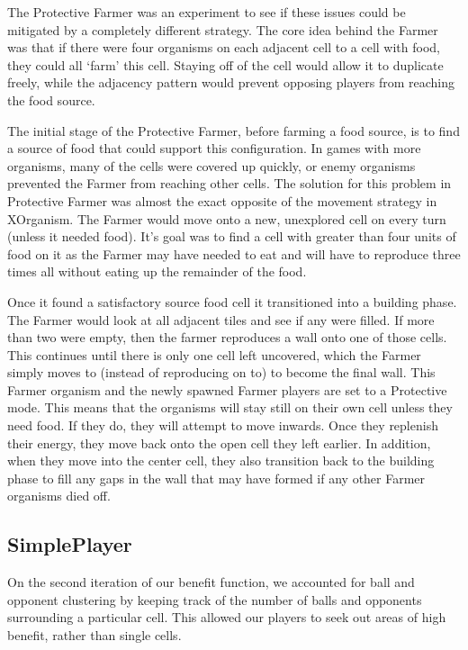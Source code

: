 \documentclass[
10pt, %
letterpaper, %
oneside, %
headinclude,footinclude, %
english
]{article}
\begin{document}
The Protective Farmer was an experiment to see if these issues could be mitigated by a completely different strategy. The core idea behind the Farmer was that if there were four organisms on each adjacent cell to a cell with food, they could all `farm' this cell. Staying off of the cell would allow it to duplicate freely, while the adjacency pattern would prevent opposing players from reaching the food source. 

The initial stage of the Protective Farmer, before farming a food source, is to find a source of food that could support this configuration. In games with more organisms, many of the cells were covered up quickly, or enemy organisms prevented the Farmer from reaching other cells. The solution for this problem in Protective Farmer was almost the exact opposite of the movement strategy in XOrganism. The Farmer would move onto a new, unexplored cell on every turn (unless it needed food). It's goal was to find a cell with greater than four units of food on it as the Farmer may have needed to eat and will have to reproduce three times all without eating up the remainder of the food. 

Once it found a satisfactory source food cell it transitioned into a building phase. The Farmer would look at all adjacent tiles and see if any were filled. If more than two were empty, then the farmer reproduces a wall onto one of those cells. This continues until there is only one cell left uncovered, which the Farmer simply moves to (instead of reproducing on to) to become the final wall. This Farmer organism and the newly spawned Farmer players are set to a Protective mode. This means that the organisms will stay still on their own cell unless they need food. If they do, they will attempt to move inwards. Once they replenish their energy, they move back onto the open cell they left earlier. In addition, when they move into the center cell, they also transition back to the building phase to fill any gaps in the wall that may have formed if any other Farmer organisms died off.

\subsection{SimplePlayer}
On the second iteration of our benefit function, we accounted for ball and opponent clustering by keeping track of the number of balls and opponents surrounding a particular cell. This allowed our players to seek out areas of high benefit, rather than single cells.
\end{document}
